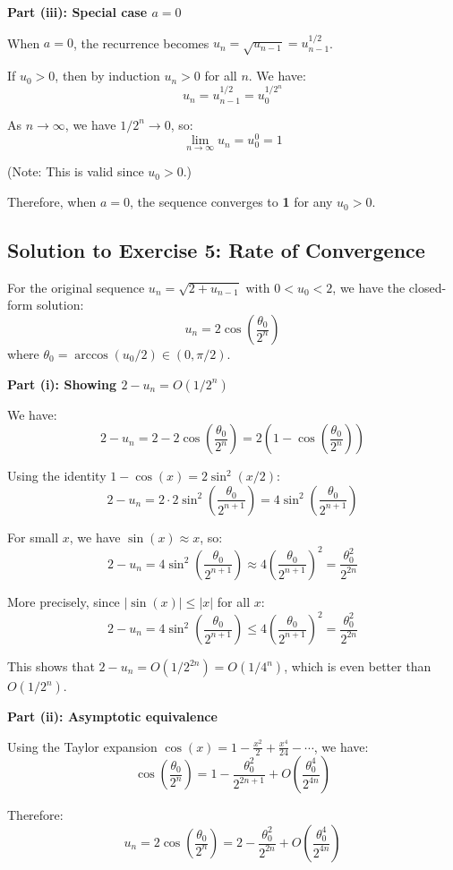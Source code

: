 \documentclass[12pt,a4paper]{article}
\theoremstyle{definition}
\begin{document}
\textbf{Part (iii): Special case $a = 0$}

When $a = 0$, the recurrence becomes $u_n = \sqrt{u_{n-1}} = u_{n-1}^{1/2}$.

If $u_0 > 0$, then by induction $u_n > 0$ for all $n$. We have:
\[
u_n = u_{n-1}^{1/2} = u_0^{1/2^n}
\]

As $n \to \infty$, we have $1/2^n \to 0$, so:
\[
\lim_{n \to \infty} u_n = u_0^0 = 1
\]

(Note: This is valid since $u_0 > 0$.)

Therefore, when $a = 0$, the sequence converges to \textbf{1} for any $u_0 > 0$.

\subsection{Solution to Exercise 5: Rate of Convergence}

For the original sequence $u_n = \sqrt{2 + u_{n-1}}$ with $0 < u_0 < 2$, we have the closed-form solution:
\[
u_n = 2\cos\left(\frac{\theta_0}{2^n}\right)
\]
where $\theta_0 = \arccos(u_0/2) \in (0, \pi/2)$.

\textbf{Part (i): Showing $2 - u_n = O(1/2^n)$}

We have:
\[
2 - u_n = 2 - 2\cos\left(\frac{\theta_0}{2^n}\right) = 2\left(1 - \cos\left(\frac{\theta_0}{2^n}\right)\right)
\]

Using the identity $1 - \cos(x) = 2\sin^2(x/2)$:
\[
2 - u_n = 2 \cdot 2\sin^2\left(\frac{\theta_0}{2^{n+1}}\right) = 4\sin^2\left(\frac{\theta_0}{2^{n+1}}\right)
\]

For small $x$, we have $\sin(x) \approx x$, so:
\[
2 - u_n = 4\sin^2\left(\frac{\theta_0}{2^{n+1}}\right) \approx 4\left(\frac{\theta_0}{2^{n+1}}\right)^2 = \frac{\theta_0^2}{2^{2n}}
\]

More precisely, since $|\sin(x)| \leq |x|$ for all $x$:
\[
2 - u_n = 4\sin^2\left(\frac{\theta_0}{2^{n+1}}\right) \leq 4\left(\frac{\theta_0}{2^{n+1}}\right)^2 = \frac{\theta_0^2}{2^{2n}}
\]

This shows that $2 - u_n = O(1/2^{2n}) = O(1/4^n)$, which is even better than $O(1/2^n)$.

\textbf{Part (ii): Asymptotic equivalence}

Using the Taylor expansion $\cos(x) = 1 - \frac{x^2}{2} + \frac{x^4}{24} - \cdots$, we have:
\[
\cos\left(\frac{\theta_0}{2^n}\right) = 1 - \frac{\theta_0^2}{2^{2n+1}} + O\left(\frac{\theta_0^4}{2^{4n}}\right)
\]

Therefore:
\[
u_n = 2\cos\left(\frac{\theta_0}{2^n}\right) = 2 - \frac{\theta_0^2}{2^{2n}} + O\left(\frac{\theta_0^4}{2^{4n}}\right)
\]
\end{document}
